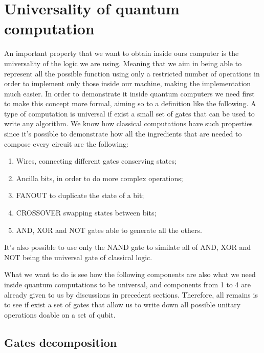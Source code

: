 \section{Universality of quantum computation}

An important property that we want to obtain inside ours computer is the universality of the logic we are using. Meaning that we aim in being able to represent all the possible function using only a restricted number of operations in order to implement only those inside our machine, making the implementation much easier. In order to demonstrate it inside quantum computers we need first to make this concept more formal, aiming so to a definition like the following.
{
    A type of computation is universal if exist a small set of gates that can be used to write any algorithm.
}
\noindent
We know how classical computations have such properties since it's possible to demonstrate how all the ingredients that are needed to compose every circuit are the following:
\begin{enumerate}[label*=\protect\fbox{\arabic{enumi}}]
    \item Wires, connecting different gates conserving states;
    \item Ancilla bits, in order to do more complex operations;
    \item FANOUT to duplicate the state of a bit;
    \item CROSSOVER swapping states between bits;
    \item AND, XOR and NOT gates able to generate all the others.
\end{enumerate}
It's also possible to use only the NAND gate to similate all of AND, XOR and NOT being the universal gate of classical logic.

What we want to do is see how the following components are also what we need inside quantum computations to be universal, and components from 1 to 4 are already given to us by discussions in precedent sections. Therefore, all remains is to see if exist a set of gates that allow us to write down all possible unitary operations doable on a set of qubit.

\subsection{Gates decomposition}

